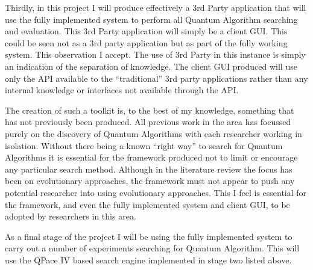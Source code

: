 \documentclass[authoryearcitations]{UoYCSproject}
\begin{document}
Thirdly, in this project I will produce effectively a 3rd Party application that will use the fully implemented system to perform all Quantum Algorithm searching and evaluation.
This 3rd Party application will simply be a client GUI.
This could be seen not as a 3rd party application but as part of the fully working system.
This observation I accept.
The use of 3rd Party in this instance is simply an indication of the separation of knowledge.
The client GUI produced will use only the API available to the ``traditional'' 3rd party applications rather than any internal knowledge or interfaces not available through the API.

The creation of such a toolkit is, to the best of my knowledge, something that has not previously been produced.
All previous work in the area has focussed purely on the discovery of Quantum Algorithms with each researcher working in isolation.
Without there being a known ``right way'' to search for Quantum Algorithms it is essential for the framework produced not to limit or encourage any particular search method.
Although in the literature review the focus has been on evolutionary approaches, the framework must not appear to push any potential researcher into using evolutionary approaches.
This I feel is essential for the framework, and even the fully implemented system and client GUI, to be adopted by researchers in this area.

As a final stage of the project I will be using the fully implemented system to carry out a number of experiments searching for Quantum Algorithm.
This will use the QPace IV based search engine implemented in stage two listed above.


\end{document}
